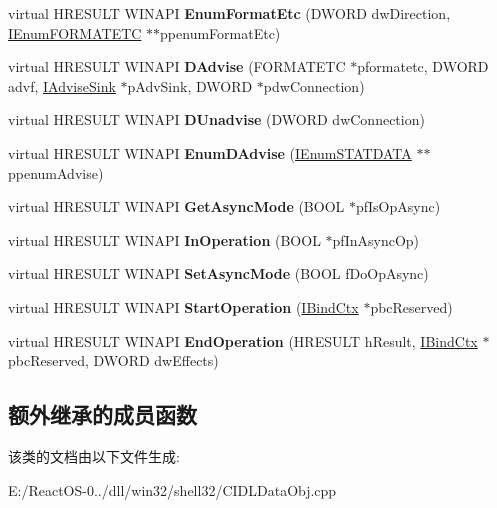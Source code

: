 \begin{DoxyCompactItemize}
virtual H\+R\+E\+S\+U\+LT W\+I\+N\+A\+PI {\bfseries Enum\+Format\+Etc} (D\+W\+O\+RD dw\+Direction, \hyperlink{interface_i_enum_f_o_r_m_a_t_e_t_c}{I\+Enum\+F\+O\+R\+M\+A\+T\+E\+TC} $\ast$$\ast$ppenum\+Format\+Etc)
\item 
\mbox{\label{class_c_i_d_l_data_obj_a30fa32ffcbb32cffdc4d77f616848236}} 
virtual H\+R\+E\+S\+U\+LT W\+I\+N\+A\+PI {\bfseries D\+Advise} (F\+O\+R\+M\+A\+T\+E\+TC $\ast$pformatetc, D\+W\+O\+RD advf, \hyperlink{interface_i_advise_sink}{I\+Advise\+Sink} $\ast$p\+Adv\+Sink, D\+W\+O\+RD $\ast$pdw\+Connection)
\item 
\mbox{\label{class_c_i_d_l_data_obj_afb98cb0003630def4150487b0e31b0e6}} 
virtual H\+R\+E\+S\+U\+LT W\+I\+N\+A\+PI {\bfseries D\+Unadvise} (D\+W\+O\+RD dw\+Connection)
\item 
\mbox{\label{class_c_i_d_l_data_obj_acd6a6b2850ecb03a2013c0dc4c58569c}} 
virtual H\+R\+E\+S\+U\+LT W\+I\+N\+A\+PI {\bfseries Enum\+D\+Advise} (\hyperlink{interface_i_enum_s_t_a_t_d_a_t_a}{I\+Enum\+S\+T\+A\+T\+D\+A\+TA} $\ast$$\ast$ppenum\+Advise)
\item 
\mbox{\label{class_c_i_d_l_data_obj_aa42b805984f10531eefbd6a6917f9432}} 
virtual H\+R\+E\+S\+U\+LT W\+I\+N\+A\+PI {\bfseries Get\+Async\+Mode} (B\+O\+OL $\ast$pf\+Is\+Op\+Async)
\item 
\mbox{\label{class_c_i_d_l_data_obj_ada114ca6364156112c042fe9da72b28d}} 
virtual H\+R\+E\+S\+U\+LT W\+I\+N\+A\+PI {\bfseries In\+Operation} (B\+O\+OL $\ast$pf\+In\+Async\+Op)
\item 
\mbox{\label{class_c_i_d_l_data_obj_a2621b4d39e1b039e5ecc9eac681683cf}} 
virtual H\+R\+E\+S\+U\+LT W\+I\+N\+A\+PI {\bfseries Set\+Async\+Mode} (B\+O\+OL f\+Do\+Op\+Async)
\item 
\mbox{\label{class_c_i_d_l_data_obj_a8a11004fe0b5fb432c7e4e280464f6fd}} 
virtual H\+R\+E\+S\+U\+LT W\+I\+N\+A\+PI {\bfseries Start\+Operation} (\hyperlink{interface_i_bind_ctx}{I\+Bind\+Ctx} $\ast$pbc\+Reserved)
\item 
\mbox{\label{class_c_i_d_l_data_obj_a5772ebe8894375e4a5e679924d68863a}} 
virtual H\+R\+E\+S\+U\+LT W\+I\+N\+A\+PI {\bfseries End\+Operation} (H\+R\+E\+S\+U\+LT h\+Result, \hyperlink{interface_i_bind_ctx}{I\+Bind\+Ctx} $\ast$pbc\+Reserved, D\+W\+O\+RD dw\+Effects)
\end{DoxyCompactItemize}
\subsection*{额外继承的成员函数}


该类的文档由以下文件生成\+:\begin{DoxyCompactItemize}
\item 
E\+:/\+React\+O\+S-\/0../dll/win32/shell32/C\+I\+D\+L\+Data\+Obj.\+cpp\end{DoxyCompactItemize}
